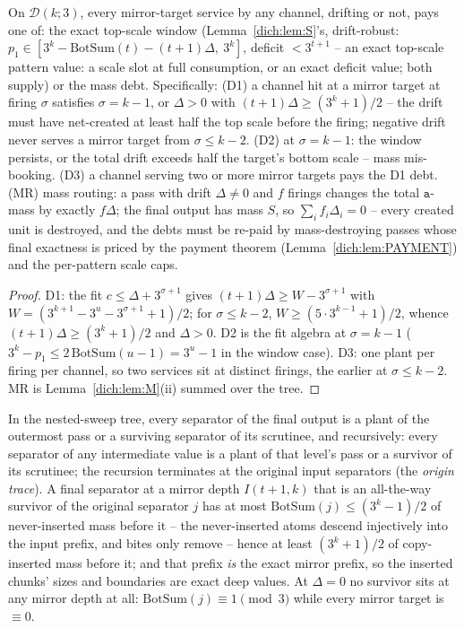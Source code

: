 \documentclass[runningheads,envcountsect]{llncs}
\begin{document}
\begin{theorem}
    \label{dich:thm:D}
    On $\mathcal D(k;3)$, every mirror-target service by any channel, drifting or not, pays one of: the exact top-scale window (Lemma~\ref{dich:lem:S}'s, drift-robust: $p_1 \in [3^{k} - \mathrm{BotSum}(t) - (t{+}1)\Delta,\ 3^{k}]$, deficit $< 3^{t+1}$ -- an exact top-scale pattern value: a scale slot at full consumption, or an exact deficit value; both supply) or the mass debt. Specifically: (D1) a channel hit at a mirror target at firing $\sigma$ satisfies $\sigma = k{-}1$, or $\Delta > 0$ with $(t{+}1)\Delta \ge (3^{k}+1)/2$ -- the drift must have net-created at least half the top scale before the firing; negative drift never serves a mirror target from $\sigma \le k{-}2$. (D2) at $\sigma = k{-}1$: the window persists, or the total drift exceeds half the target's bottom scale -- mass mis-booking. (D3) a channel serving two or more mirror targets pays the D1 debt. (MR) mass routing: a pass with drift $\Delta \ne 0$ and $f$ firings changes the total $\mathtt a$-mass by exactly $f\Delta$; the final output has mass $S$, so $\sum_i f_i \Delta_i = 0$ -- every created unit is destroyed, and the debts must be re-paid by mass-destroying passes whose final exactness is priced by the payment theorem (Lemma~\ref{dich:lem:PAYMENT}) and the per-pattern scale caps.
\end{theorem}

\begin{proof}
    D1: the fit $c \le \Delta + 3^{\sigma+1}$ gives $(t{+}1)\Delta \ge W - 3^{\sigma+1}$ with $W = (3^{k+1} - 3^{u} - 3^{\sigma+1} + 1)/2$; for $\sigma \le k{-}2$, $W \ge (5 \cdot 3^{k-1} + 1)/2$, whence $(t{+}1)\Delta \ge (3^{k}+1)/2$ and $\Delta > 0$. D2 is the fit algebra at $\sigma = k{-}1$ ($3^{k} - p_1 \le 2\,\mathrm{BotSum}(u{-}1) = 3^{u} - 1$ in the window case). D3: one plant per firing per channel, so two services sit at distinct firings, the earlier at $\sigma \le k{-}2$. MR is Lemma~\ref{dich:lem:M}(ii) summed over the tree.
\end{proof}

\begin{lemma}
    \label{dich:lem:INH}
    In the nested-sweep tree, every separator of the final output is a plant of the outermost pass or a surviving separator of its scrutinee, and recursively: every separator of any intermediate value is a plant of that level's pass or a survivor of its scrutinee; the recursion terminates at the original input separators (the \emph{origin trace}). A final separator at a mirror depth $I(t{+}1,k)$ that is an all-the-way survivor of the original separator $j$ has at most $\mathrm{BotSum}(j) \le (3^{k}-1)/2$ of never-inserted mass before it -- the never-inserted atoms descend injectively into the input prefix, and bites only remove -- hence at least $(3^{k}+1)/2$ of copy-inserted mass before it; and that prefix \emph{is} the exact mirror prefix, so the inserted chunks' sizes and boundaries are exact deep values. At $\Delta = 0$ no survivor sits at any mirror depth at all: $\mathrm{BotSum}(j) \equiv 1 \pmod 3$ while every mirror target is $\equiv 0$.
\end{lemma}
\end{document}

